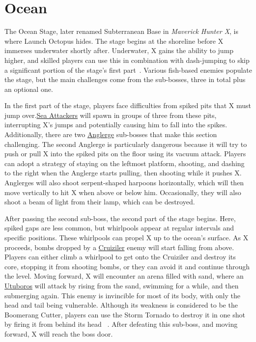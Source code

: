 \section{Ocean}

The Ocean Stage, later renamed Subterranean Base in \textit{Maverick Hunter X}, is where Launch Octopus hides. The stage begins at the shoreline before X immerses underwater shortly after. Underwater, X gains the ability to jump higher, and skilled players can use this in combination with dash-jumping to skip a significant portion of the stage's first part~\cite{stratwiki:Ocean}. Various fish-based enemies populate the stage, but the main challenges come from the sub-bosses, three in total plus an optional one.

In the first part of the stage, players face difficulties from spiked pits that X must jump over.\hyperlink{enem:Sea_Attacker}{Sea Attackers} will spawn in groups of three from these pits, interrupting X's jumps and potentially causing him to fall into the spikes. Additionally, there are two \hyperlink{miniboss:Anglerge}{Anglerge} sub-bosses that make this section challenging. The second Anglerge is particularly dangerous because it will try to push or pull X into the spiked pits on the floor using its vacuum attack. Players can adopt a strategy of staying on the leftmost platform, shooting, and dashing to the right when the Anglerge starts pulling, then shooting while it pushes X. Anglerges will also shoot serpent-shaped harpoons horizontally, which will then move vertically to hit X when above or below him. Occasionally, they will also shoot a beam of light from their lamp, which can be destroyed.

After passing the second sub-boss, the second part of the stage begins. Here, spiked gaps are less common, but whirlpools appear at regular intervals and specific positions. These whirlpools can propel X up to the ocean's surface. As X proceeds, bombs dropped by a \hyperlink{miniboss:Cruiziler}{Cruiziler} enemy will start falling from above. Players can either climb a whirlpool to get onto the Cruiziler and destroy its core, stopping it from shooting bombs, or they can avoid it and continue through the level. Moving forward, X will encounter an arena filled with sand, where an \hyperlink{miniboss:Utuboros}{Utuboros} will attack by rising from the sand, swimming for a while, and then submerging again. This enemy is invincible for most of its body, with only the head and tail being vulnerable. Although its weakness is considered to be the Boomerang Cutter, players can use the Storm Tornado to destroy it in one shot by firing it from behind its head ~\cite{wiki:Utuboros}. After defeating this sub-boss, and moving forward, X will reach the boss door.

